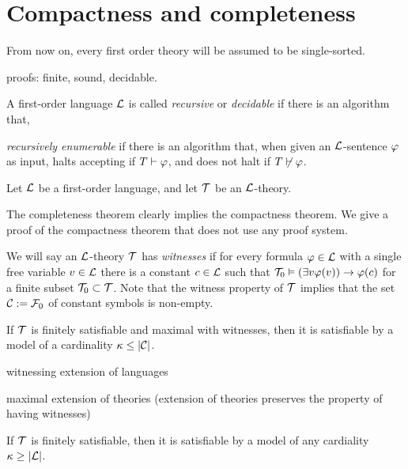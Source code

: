 \documentclass{../../large}
\begin{document}
\section{Compactness and completeness}

From now on, every first order theory will be assumed to be single-sorted.

proofs: finite, sound, decidable.

A first-order language $\mathcal{L}$ is called \emph{recursive} or \emph{decidable} if there is an algorithm that,

\emph{recursively enumerable} if there is an algorithm that, when given an $\mathcal{L}$-sentence $\varphi$ as input, halts accepting if $T\vdash\varphi$, and does not halt if $T\not\vdash\varphi$.


\begin{prb}
Let $\mathcal{L}$ be a first-order language, and let $\mathcal{T}$ be an $\mathcal{L}$-theory.

The completeness theorem clearly implies the compactness theorem.
We give a proof of the compactness theorem that does not use any proof system.

We will say an $\mathcal{L}$-theory $\mathcal{T}$ has \emph{witnesses} if for every formula $\varphi\in\mathcal{L}$ with a single free variable $v\in\mathcal{L}$ there is a constant $c\in\mathcal{L}$ such that $\mathcal{T}_0\vDash(\exists v\varphi(v))\to\varphi(c)$ for a finite subset $\mathcal{T}_0\subset\mathcal{T}$.
Note that the witness property of $\mathcal{T}$ implies that the set $\mathcal{C}:=\mathcal{F}_0$ of constant symbols is non-empty.

\begin{parts}
\item If $\mathcal{T}$ is finitely satisfiable and maximal with witnesses, then it is satisfiable by a model of a cardinality $\kappa\le|\mathcal{C}|$.
\item witnessing extension of languages
\item maximal extension of theories (extension of theories preserves the property of having witnesses)
\item If $\mathcal{T}$ is finitely satisfiable, then it is satisfiable by a model of any cardiality $\kappa\ge|\mathcal{L}|$.
\end{parts}
\end{prb}
\end{document}
